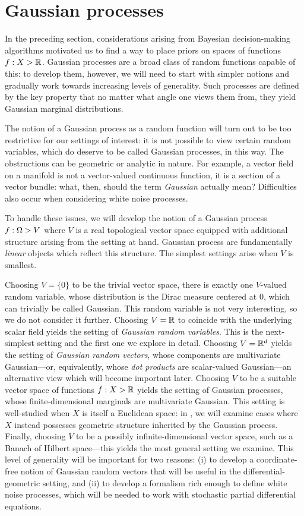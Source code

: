 \documentclass[11pt]{book}
\begin{document}
\section{Gaussian processes}

In the preceding section, considerations arising from Bayesian decision-making algorithms motivated us to find a way to place priors on spaces of functions $f : X \-> \mathbb{R}$.
Gaussian processes are a broad class of random functions capable of this: to develop them, however, we will need to start with simpler notions and gradually work towards increasing levels of generality.
Such processes are defined by the key property that no matter what angle one views them from, they yield Gaussian marginal distributions.

The notion of a Gaussian process as a random function will turn out to be too restrictive for our settings of interest: it is not possible to view certain random variables, which do deserve to be called Gaussian processes, in this way.
The obstructions can be geometric or analytic in nature.
For example, a vector field on a manifold is not a vector-valued continuous function, it is a section of a vector bundle: what, then, should the term \emph{Gaussian} actually mean?
Difficulties also occur when considering white noise processes.

To handle these issues, we will develop the notion of a Gaussian process $f : \Omega \-> V$ where $V$ is a real topological vector space equipped with additional structure arising from the setting at hand.
Gaussian process are fundamentally \emph{linear} objects which reflect this structure.
The simplest settings arise when $V$ is smallest.

\1  Choosing $V = \{0\}$ to be the trivial vector space, there is exactly one $V$-valued random variable, whose distribution is the Dirac measure centered at $0$, which can trivially be called Gaussian.
This random variable is not very interesting, so we do not consider it further.
\2 Choosing $V = \mathbb{R}$ to coincide with the underlying scalar field yields the setting of \emph{Gaussian random variables}.
This is the next-simplest setting and the first one we explore in detail.
\3 Choosing $V = \mathbb{R}^d$ yields the setting of \emph{Gaussian random vectors}, whose components are multivariate Gaussian---or, equivalently, whose \emph{dot products} are scalar-valued Gaussian---an alternative view which will become important later.
\4 Choosing $V$ to be a suitable vector space of functions $f : X \-> \mathbb{R}$ yields the setting of Gaussian processes, whose finite-dimensional marginals are multivariate Gaussian.
This setting is well-studied when $X$ is itself a Euclidean space: in , we will examine cases where $X$ instead possesses geometric structure inherited by the Gaussian process.
\5 Finally, choosing $V$ to be a possibly infinite-dimensional vector space, such as a Banach of Hilbert space---this yields the most general setting we examine.
This level of generality will be important for two reasons: (i) to develop a coordinate-free notion of Gaussian random vectors that will be useful in the differential-geometric setting, and (ii) to develop a formalism rich enough to define white noise processes, which will be needed to work with stochastic partial differential equations.
\0 
\end{document}
